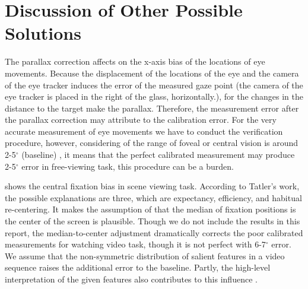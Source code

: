 \documentclass{article}
\begin{document}
\section{Discussion of Other Possible Solutions}

The parallax correction affects on the x-axis bias of the locations of eye movements. Because the displacement of the locations of the eye and the camera of the eye tracker induces the error of the measured gaze point (the camera of the eye tracker is placed in the right of the glass, horizontally.), for the changes in the distance to the target make the parallax. Therefore, the measurement error after the parallax correction may attribute to the calibration error. For the very accurate measurement of eye movements we have to conduct the verification procedure, however, considering of the range of foveal or central vision is around 2-5$^{\circ}$ (baseline) \citep{mcmorris2014acquisition}, it means that the perfect calibrated measurement may produce 2-5$^{\circ}$ error in free-viewing task, this procedure can be a burden.

\cite{tatler2007central} shows the central fixation bias in scene viewing task. According to Tatler's work, the possible explanations are three, which are expectancy, efficiency, and habitual re-centering. It makes the assumption of that the median of fixation positions is the center of the screen is plausible. Though we do not include the results in this report, the median-to-center adjustment dramatically corrects the poor calibrated measurements for watching video task, though it is not perfect with 6-7$^{\circ}$ error. We assume that the non-symmetric distribution of salient features in a video sequence raises the additional error to the baseline. Partly, the high-level interpretation of the given features also contributes to this influence \citep{tatler2005visual}.







\end{document}
